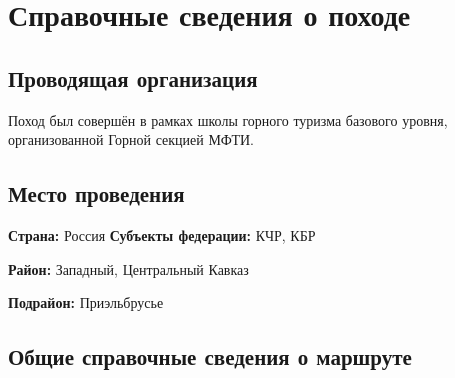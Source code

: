\section{Справочные сведения о походе} 
\subsection{Проводящая организация}
\alert{Поход был совершён в рамках школы горного туризма базового уровня, организованной Горной секцией МФТИ.}


\subsection{Место проведения}
\textbf{Страна:} Россия
\textbf{Субъекты федерации:} КЧР, КБР

\textbf{Район:} Западный, Центральный Кавказ

\textbf{Подрайон:} Приэльбрусье


\subsection{Общие справочные сведения о маршруте}

